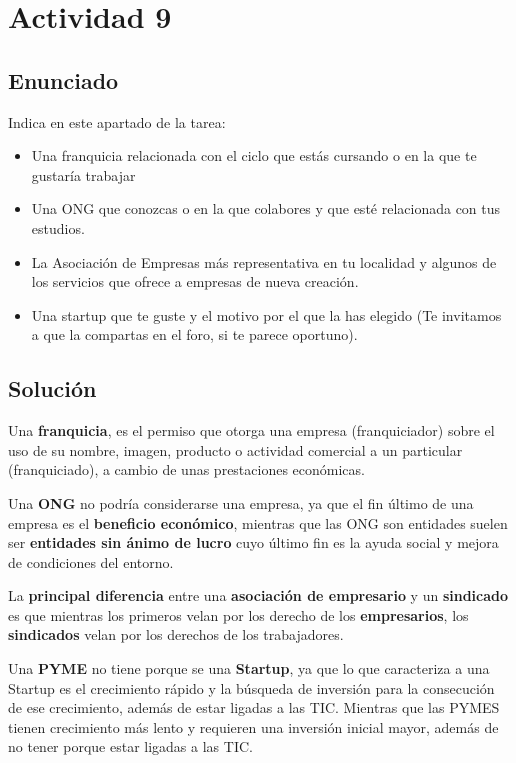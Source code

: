 \section{Actividad 9}
\subsection{Enunciado}
Indica en este apartado de la tarea:

\begin{itemize}
    \item Una franquicia relacionada con el ciclo que estás cursando o en la que te gustaría trabajar
    \item Una ONG que conozcas o en la que colabores y que esté relacionada con tus estudios.
    \item La Asociación de Empresas más representativa en tu localidad y algunos de los servicios que ofrece a empresas de nueva creación.
    \item Una startup que te guste y el motivo por el que la has elegido (Te invitamos a que la compartas en el foro, si te parece oportuno).
\end{itemize}

\subsection{Solución}
Una \textbf{franquicia}, es el permiso que otorga una empresa (franquiciador) sobre el uso de su nombre, imagen, producto o actividad comercial a un particular (franquiciado), a cambio de unas prestaciones económicas.

Una \textbf{ONG} no podría considerarse una empresa, ya que el fin último de una empresa es el \textbf{beneficio económico}, mientras que las ONG son entidades suelen ser \textbf{entidades sin ánimo de lucro} cuyo último fin es la ayuda social y mejora de condiciones del entorno.

La \textbf{principal diferencia} entre una \textbf{asociación de empresario} y un \textbf{sindicado} es que mientras los primeros velan por los derecho de los \textbf{empresarios}, los \textbf{sindicados} velan por los derechos de los trabajadores.

Una \textbf{PYME} no tiene porque se una \textbf{Startup}, ya que lo que caracteriza a una Startup es el crecimiento rápido y la búsqueda de inversión para la consecución de ese crecimiento, además de estar ligadas a las TIC. Mientras que las PYMES tienen crecimiento más lento y requieren una inversión inicial mayor, además de no tener porque estar ligadas a las TIC.

